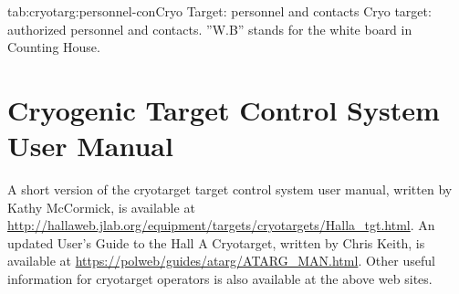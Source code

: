 {\begin{namestab}{tab:cryotarg:personnel-con}{Cryo Target: personnel and contacts}{%
   Cryo target: authorized personnel and contacts. ''W.B'' stands for the white board
   in Counting House.}
   \KathyMcCormick{}
   \DaveMeekins{}
   \MikellSeely{}
   \ChristopherKeith{}
\end{namestab}

} %
\section[Cryogenic Target Control System User Manual]
{Cryogenic Target Control System User Manual 
}
A short version of 
the cryotarget target control system user manual, written by Kathy 
McCormick, is available at
\url{http://hallaweb.jlab.org/equipment/targets/cryotargets/Halla_tgt.html}.
An updated User's Guide to the Hall A Cryotarget, written by Chris Keith,
is available at \url{https://polweb/guides/atarg/ATARG_MAN.html}.  Other useful
information for cryotarget operators 
is also available at the above web sites.



%
 
